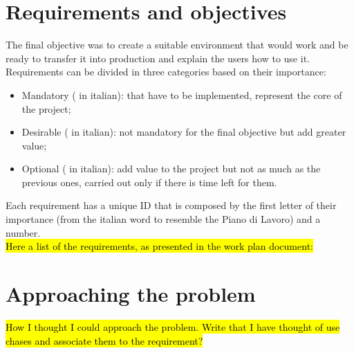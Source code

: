 \section{Requirements and objectives}
	The final objective was to create a suitable environment that would work and be ready to transfer it into production and explain the users how to use it.\\
	Requirements can be divided in three categories based on their importance:
	\begin{itemize}
		\item Mandatory ( in italian): that have to be implemented, represent the core of the project;
		\item Desirable ( in italian): not mandatory for the final objective but add greater value;
		\item Optional ( in italian): add value to the project but not as much as the previous ones, carried out only if there is time left for them.
	\end{itemize}
	Each requirement has a unique ID that is composed by the first letter of their importance (from the italian word to resemble the Piano di Lavoro) and a number.\\
	\hl{Here a list of the requirements, as presented in the work plan document:}

\section{Approaching the problem}

	\hl{How I thought I could approach the problem.
	Write that I have thought of use chases and associate them to the requirement?}

